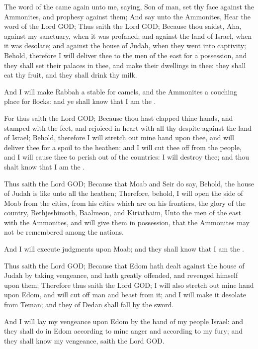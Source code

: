 \Chapter
\Verse The word of the \LORD came again unto me, saying, \Verse Son of man, set thy face against the Ammonites, and prophesy against them; \Verse And say unto the Ammonites, Hear the word of the Lord GOD; Thus saith the Lord GOD; Because thou saidst, Aha, against my sanctuary, when it was profaned; and against the land of Israel, when it was desolate; and against the house of Judah, when they went into captivity; \Verse Behold, therefore I will deliver thee to the men of the east for a possession, and they shall set their palaces in thee, and make their dwellings in thee: they shall eat thy fruit, and they shall drink thy milk.

\Verse And I will make Rabbah a stable for camels, and the Ammonites a couching place for flocks: and ye shall know that I am the \LORD.

\Verse For thus saith the Lord GOD; Because thou hast clapped thine hands, and stamped with the feet, and rejoiced in heart with all thy despite against the land of Israel; \Verse Behold, therefore I will stretch out mine hand upon thee, and will deliver thee for a spoil to the heathen; and I will cut thee off from the people, and I will cause thee to perish out of the countries: I will destroy thee; and thou shalt know that I am the \LORD.

\Verse Thus saith the Lord GOD; Because that Moab and Seir do say, Behold, the house of Judah is like unto all the heathen; \Verse Therefore, behold, I will open the side of Moab from the cities, from his cities which are on his frontiers, the glory of the country, Bethjeshimoth, Baalmeon, and Kiriathaim, \Verse Unto the men of the east with the Ammonites, and will give them in possession, that the Ammonites may not be remembered among the nations.

\Verse And I will execute judgments upon Moab; and they shall know that I am the \LORD.

\Verse Thus saith the Lord GOD; Because that Edom hath dealt against the house of Judah by taking vengeance, and hath greatly offended, and revenged himself upon them; \Verse Therefore thus saith the Lord GOD; I will also stretch out mine hand upon Edom, and will cut off man and beast from it; and I will make it desolate from Teman; and they of Dedan shall fall by the sword.

\Verse And I will lay my vengeance upon Edom by the hand of my people Israel: and they shall do in Edom according to mine anger and according to my fury; and they shall know my vengeance, saith the Lord GOD.

